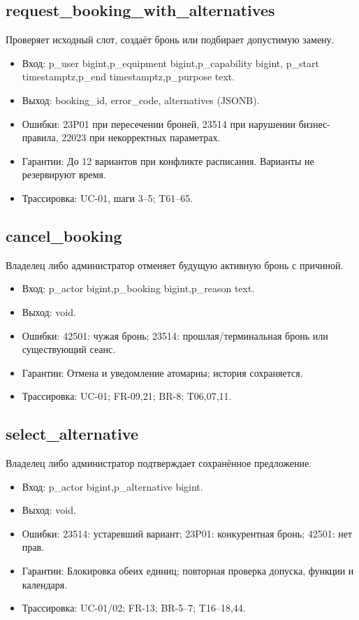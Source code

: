 \subsection{request\_\allowbreak{}booking\_\allowbreak{}with\_\allowbreak{}alternatives}
Проверяет исходный слот, создаёт бронь или подбирает допустимую замену.
\begin{itemize}
\item Вход: p\_\allowbreak{}user bigint,p\_\allowbreak{}equipment bigint,p\_\allowbreak{}capability bigint,  p\_\allowbreak{}start timestamptz,p\_\allowbreak{}end timestamptz,p\_\allowbreak{}purpose text.
\item Выход: booking\_\allowbreak{}id, error\_\allowbreak{}code, alternatives (JSONB).
\item Ошибки: 23P01 при пересечении броней, 23514 при нарушении бизнес-правила, 22023 при некорректных параметрах.
\item Гарантии: До 12 вариантов при конфликте расписания. Варианты не резервируют время.
\item Трассировка: UC-01, шаги 3–5; T61–65.
\end{itemize}
\subsection{cancel\_\allowbreak{}booking}
Владелец либо администратор отменяет будущую активную бронь с причиной.
\begin{itemize}
\item Вход: p\_\allowbreak{}actor bigint,p\_\allowbreak{}booking bigint,p\_\allowbreak{}reason text.
\item Выход: void.
\item Ошибки: 42501: чужая бронь; 23514: прошлая/\allowbreak{}терминальная бронь или существующий сеанс.
\item Гарантии: Отмена и уведомление атомарны; история сохраняется.
\item Трассировка: UC-01; FR-09,21; BR-8; T06,07,11.
\end{itemize}
\subsection{select\_\allowbreak{}alternative}
Владелец либо администратор подтверждает сохранённое предложение.
\begin{itemize}
\item Вход: p\_\allowbreak{}actor bigint,p\_\allowbreak{}alternative bigint.
\item Выход: void.
\item Ошибки: 23514: устаревший вариант; 23P01: конкурентная бронь; 42501: нет прав.
\item Гарантии: Блокировка обеих единиц; повторная проверка допуска, функции и календаря.
\item Трассировка: UC-01/\allowbreak{}02; FR-13; BR-5–7; T16–18,44.
\end{itemize}
